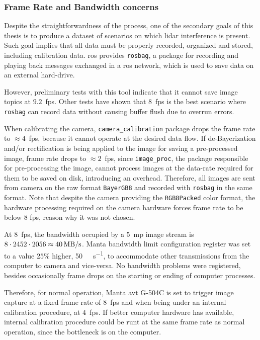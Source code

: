 \subsubsection{Frame Rate and Bandwidth concerns}
Despite the straightforwardness of the process, one of the secondary goals of this thesis is to produce a dataset of scenarios on which \ac{lidar} interference is present. Such goal implies that all data must be properly recorded, organized and stored, including calibration data. \ac{ros} provides \texttt{rosbag}, a package for recording and playing back messages exchanged in a \ac{ros} network, which is used to save data on an external hard-drive.

However, preliminary tests with this tool indicate that it cannot save image topics at $9.2$~\ac{fps}. Other tests have shown that $8$~\ac{fps} is the best scenario where \texttt{rosbag} can record data without causing buffer flush due to overrun errors. 

When calibrating the camera, \texttt{camera\_calibration} package drops the frame rate to $\approx 4$~\ac{fps}, because it cannot operate at the desired data flow. If de-Bayerization and/or rectification is being applied to the image for saving a pre-processed image, frame rate drops to $\approx 2$~\ac{fps}, since \texttt{image\_proc}, the package responsible for pre-processing the image, cannot process images at the data-rate required for them to be saved on disk, introducing an overhead. Therefore, all images are sent from camera on the raw format \texttt{BayerGB8} and recorded with \texttt{rosbag} in the same format. Note that despite the camera providing  the \texttt{RGB8Packed} color format, the hardware processing required on the camera hardware forces frame rate to be below $8$ \ac{fps}, reason why it was not chosen.

At 8~\ac{fps}, the bandwidth occupied by a 5~\ac{mp} image stream is $8 \cdot 2452 \cdot 2056 \approx \SI[per-mode=symbol]{40}{\mega\byte\per\second}$. Manta bandwidth limit configuration register was set to a value $25\%$ higher, \SI[per-mode=symbol]{50}{\mega\byte\per\second}, to accommodate other transmissions from the computer to camera and vice-versa. No bandwidth problems were registered, besides occasionally frame drops on the starting or ending of computer processes.

Therefore, for normal operation, Manta \ac{avt} G-504C is set to trigger image capture at a fixed frame rate of $8$~\ac{fps} and when being under an internal calibration procedure, at $4$~\ac{fps}. If better computer hardware has available, internal calibration procedure could be runt at the same frame rate as normal operation, since the bottleneck is on the computer.

